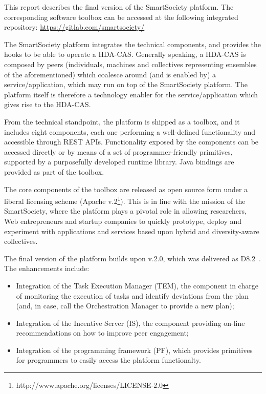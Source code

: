 This report describes the final version of the SmartSociety platform. The corresponding software toolbox can be accessed at the following integrated repository:
\url{https://gitlab.com/smartsociety/}


The SmartSociety platform integrates the technical components, and provides the hooks to be able to operate a HDA-CAS. Generally speaking, a HDA-CAS is composed by peers (individuals, machines and collectives representing ensembles of the aforementioned) which coalesce around (and is enabled by) a service/application, which may run on top of the SmartSociety platform. The platform itself is therefore a technology enabler for the service/application which gives rise to the HDA-CAS. 

From the technical standpoint, the platform is shipped as a toolbox, and it includes eight components, each one performing a well-defined functionality and accessible through REST APIs. Functionality exposed by the components can be accessed directly or by means of a set of programmer-friendly primitives, supported by a purposefully developed runtime library. Java bindings are provided as part of the toolbox. 

The core components of the toolbox are released as open source form under a liberal licensing scheme (Apache v.2\footnote{http://www.apache.org/licenses/LICENSE-2.0}). This is in line with the mission of the SmartSociety, where the platform plays a pivotal role in allowing researchers, Web entrepreneurs and startup companies to quickly prototype, deploy and experiment with applications and services based upon hybrid and diversity-aware collectives.

The final version of the platform builds upon v.2.0, which was delivered as D8.2~\cite{D8.2}. The enhancements include:
\begin{itemize}
\item Integration of the Task Execution Manager (TEM), the component in charge of monitoring the execution of tasks and identify deviations from the plan (and, in case, call the Orchestration Manager to provide a new plan);
\item Integration of the Incentive Server (IS), the component providing on-line recommendations on how to improve peer engagement;
\item Integration of the programming framework (PF), which provides primitives for programmers to easily access the platform functionalty.
\end{itemize}

